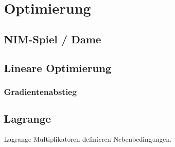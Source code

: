 \section{Optimierung}
\subsection{NIM-Spiel / Dame}
\subsection{Lineare Optimierung}
\subsubsection{Gradientenabstieg}
\subsection{Lagrange}
Lagrange Multiplikatoren definieren Nebenbedingungen.

